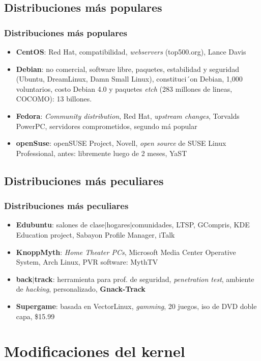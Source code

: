 \documentclass[spanish]{beamer}
\begin{document}
  \subsection{Distribuciones más populares}
\frame
  {
    \frametitle{Distribuciones más populares}
    \begin{itemize}
    	\item \textbf{CentOS}: Red Hat, compatibilidad, \textit{webservers} (top500.org), Lance Davis
    	\item \textbf{Debian}: no comercial, software libre, paquetes, estabilidad y seguridad (Ubuntu, DreamLinux, Damn Small Linux), constituci´on Debian, 1,000 voluntarios, costo Debian 4.0 y paquetes \textit{etch} (283 millones de lineas, COCOMO): 13 billones.
    	\item \textbf{Fedora}: \textit{Community distribution}, Red Hat, \textit{upstream changes}, Torvalds PowerPC, servidores comprometidos, segundo m\'{a} popular
    	\item \textbf{openSuse}: openSUSE Project, Novell, \textit{open source} de SUSE Linux Professional, antes: libremente luego de 2 meses, YaST 
    \end{itemize}
  }  
  
  \subsection{Distribuciones más peculiares}
  \frame
  {
    \frametitle{Distribuciones más peculiares}
    \begin{itemize}
    	\item \textbf{Edubuntu}: salones de clase$|$hogares$|$comunidades, LTSP, GCompris, KDE Education project, Sabayon Profile Manager, iTalk
    	\item \textbf{KnoppMyth}: \textit{Home Theater PCs}, Microsoft Media Center Operative System, Arch Linux, PVR software: MythTV
    	\item \textbf{back}$|$\textbf{track}: herramienta para prof. de seguridad, \textit{penetration test}, ambiente de \textit{hacking}, personalizado, \textbf{Gnack-Track}
    	\item \textbf{Supergame}: basada en VectorLinux, \textit{gamming}, 20 juegos, iso de DVD doble capa, \$15.99
    \end{itemize}
  }
  
  \section{Modificaciones del kernel}
\end{document}
